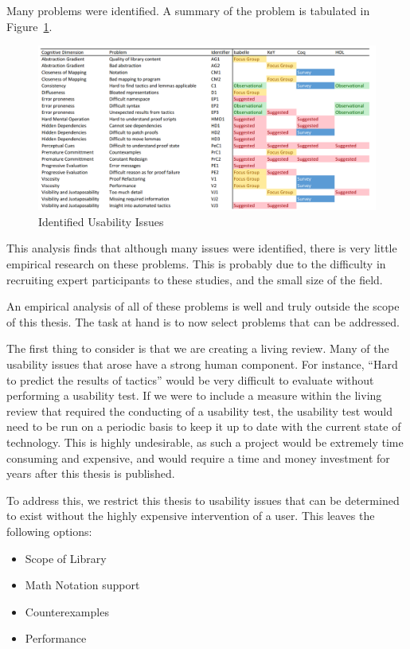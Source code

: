 \documentclass[
]{article}
\providecommand{\tightlist}{%
  \setlength{\itemsep}{0pt}\setlength{\parskip}{0pt}}
\begin{document}
Many problems were identified. A summary of the problem is tabulated in
Figure~\ref{fig:usability_issues}.

\begin{figure}
\hypertarget{fig:usability_issues}{%
\centering
\includegraphics{./Images/MyProblem.png}
\caption{Identified Usability Issues}\label{fig:usability_issues}
}
\end{figure}

This analysis finds that although many issues were identified, there is
very little empirical research on these problems. This is probably due
to the difficulty in recruiting expert participants to these studies,
and the small size of the field.

An empirical analysis of all of these problems is well and truly outside
the scope of this thesis. The task at hand is to now select problems
that can be addressed.

The first thing to consider is that we are creating a living review.
Many of the usability issues that arose have a strong human component.
For instance, ``Hard to predict the results of tactics'' would be very
difficult to evaluate without performing a usability test. If we were to
include a measure within the living review that required the conducting
of a usability test, the usability test would need to be run on a
periodic basis to keep it up to date with the current state of
technology. This is highly undesirable, as such a project would be
extremely time consuming and expensive, and would require a time and
money investment for years after this thesis is published.

To address this, we restrict this thesis to usability issues that can be
determined to exist without the highly expensive intervention of a user.
This leaves the following options:

\begin{itemize}
\tightlist
\item
  Scope of Library
\item
  Math Notation support
\item
  Counterexamples
\item
  Performance
\end{itemize}
\end{document}
